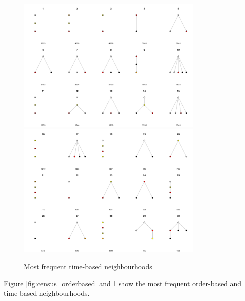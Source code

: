 \documentclass[conference]{IEEEtran}
\begin{document}
\begin{figure}
	\centering
	\includegraphics[width=0.8\textwidth]{census_timebased_1}
	\includegraphics[width=0.8\textwidth]{census_timebased_2}
	\caption{Most frequent time-based neighbourhoods}
	\label{fig:neighbourhoods_time}
\end{figure}

Figure \ref{fig:census_orderbased} and \ref{fig:neighbourhoods_time} show the most frequent order-based and time-based neighbourhoods.

\end{document}
